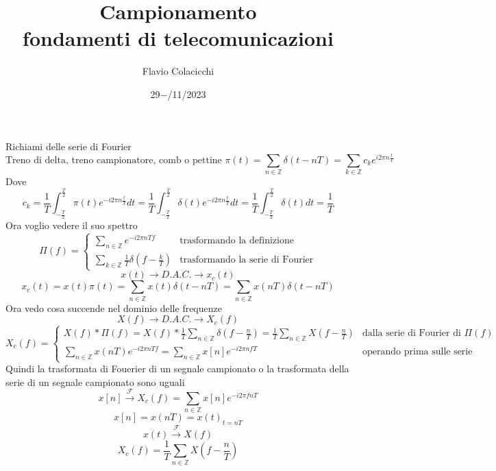 \documentclass{article}
\title{Campionamento\\\normalsize fondamenti di telecomunicazioni}
\author{Flavio Colacicchi}
\date{29$-$/11/2023}
\newcommand{\trasformata}{\xrightarrow{\mathscr{F}}}
\begin{document}
\maketitle

Richiami delle serie di Fourier
\[\text{Treno di delta, treno campionatore, comb o pettine }\pi(t)=\sum_{n\in\mathbb{Z}}\delta(t-nT)=\sum_{k\in\mathbb{Z}}c_k e^{i2\pi n\frac{t}{T}}\]
Dove
\[c_k=\frac{1}{T}\int_{-\frac{T}{2}}^{\frac{T}{2}}\pi(t)e^{-i2\pi n\frac{t}{T}}dt=\frac{1}{T}\int_{-\frac{T}{2}}^\frac{T}{2}\delta(t)e^{-i2\pi n\frac{t}{T}}dt=\frac{1}{T}\int_{-\frac{T}{2}}^\frac{T}{2}\delta(t)dt=\frac{1}{T}\]
Ora voglio vedere il suo spettro
\[\Pi(f)=\begin{cases}
    \sum_{n\in\mathbb{Z}}e^{-i2\pi nTf}&\text{trasformando la definizione}\\
    \sum_{k\in\mathbb{Z}}\frac{1}{T}\delta\left(f-\frac{k}{T}\right)&\text{trasformando la serie di Fourier}
\end{cases}\]
\Large\[x(t)\to\boxed{D.A.C.}\to x_c(t)\]
\[x_c(t)=x(t)\pi(t)=\sum_{n\in\mathbb{Z}}x(t)\delta(t-nT)=\sum_{n\in\mathbb{Z}}x(nT)\delta(t-nT)\]\normalsize
Ora vedo cosa succende nel dominio delle frequenze
\[X(f)\to\boxed{D.A.C.}\to X_c(f)\]
\[X_c(f)=\begin{cases}
    X(f)*\Pi(f)=X(f)*\frac{1}{T}\sum_{n\in\mathbb{Z}}\delta\left(f-\frac{n}{T}\right)=\frac{1}{T}\sum_{n\in\mathbb{Z}}X\left(f-\frac{n}{T}\right)&\text{dalla serie di Fourier di \(\Pi(f)\)}\\
    \sum_{n\in\mathbb{Z}}x(nT)e^{-i2\pi nTf}=\sum_{n\in\mathbb{Z}}x[n]e^{-i2\pi nfT}&\text{operando prima sulle serie nel tempo}
\end{cases}\]
Quindi la trasformata di Fouerier di un segnale campionato o la trasformata della serie di un segnale campionato sono uguali
\[x[n]\trasformata X_c(f)=\sum_{n\in\mathbb{Z}}x[n]e^{-i2\pi fnT}\]
\[x[n]=x(nT)={x(t)}_{t=nT}\]
\[x(t)\trasformata X(f)\]
\[X_c(f)=\frac{1}{T}\sum_{n\in\mathbb{Z}}X\left(f-\frac{n}{T}\right)\]
\end{document}
